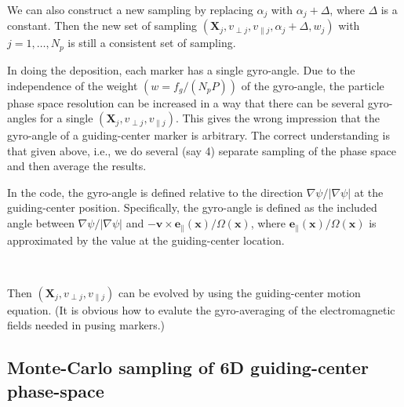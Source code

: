 \documentclass{llncs}
\begin{document}
We can also construct a new sampling by replacing $\alpha_j$ with $\alpha_j +
\Delta$, where $\Delta$ is a constant. Then the new set of sampling
$(\mathbf{X}_j, v_{\perp j}, v_{\parallel j}, \alpha_j + \Delta, w_j)$ with $j
= 1, \ldots, N_p$ is still a consistent set of sampling.

In doing the deposition, each marker has a single gyro-angle. Due to the
independence of the weight $(w = f_g / (N_p P))$ of the gyro-angle, the
particle phase space resolution can be increased in a way that there can be
several gyro-angles for a single $(\mathbf{X}_j, v_{\perp j}, v_{\parallel
j})$. This gives the wrong impression that the gyro-angle of a guiding-center
marker is arbitrary. The correct understanding is that given above, i.e., we
do several (say 4) separate sampling of the phase space and then average the
results.

In the code, the gyro-angle is defined relative to the direction $\nabla \psi
/ | \nabla \psi |$ at the guiding-center position. Specifically, the
gyro-angle is defined as the included angle between $\nabla \psi / | \nabla
\psi |$ and $-\mathbf{v} \times \mathbf{e}_{\parallel} (\mathbf{x}) / \Omega
(\mathbf{x})$, where $\mathbf{e}_{\parallel} (\mathbf{x}) / \Omega
(\mathbf{x})$ is approximated by the value at the guiding-center location.

\

Then $(\mathbf{X}_j, v_{\perp j}, v_{\parallel j})$ can be evolved by using
the guiding-center motion equation. (It is obvious how to evalute the
gyro-averaging of the electromagnetic fields needed in pusing markers.)

\subsection{Monte-Carlo sampling of 6D guiding-center phase-space
}\label{19-1-28-1}
\end{document}
